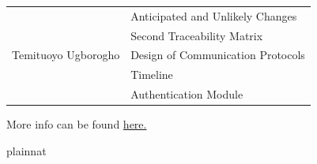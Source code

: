 \documentclass[12pt, titlepage]{article}
\begin{document}
\begin{center}
\begin{tabular}{| p{} | p{} |}
    \midrule

    \multirow{5}{0.3\textwidth}{Temituoyo Ugborogho}
                & Anticipated and Unlikely Changes  \\
                & Second Traceability Matrix        \\
                & Design of Communication Protocols \\
                & Timeline                          \\
                & Authentication Module             \\

    \bottomrule
  \end{tabular}
\end{center}

More info can be found \href{https://github.com/dcheung11/team-6-capstone-project}{here.}

 {plainnat}


\newpage{}
\end{document}
